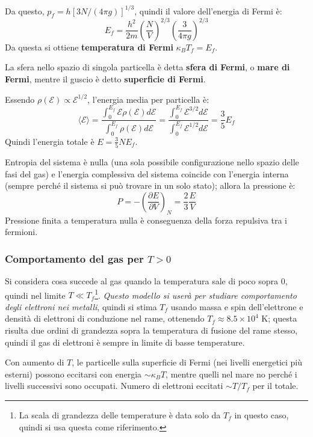 \documentclass[10pt, a4paper]{scrartcl}
\numberwithin{equation}{subsection}
\theoremstyle{style1}
\begin{document}
Da questo, $p_f = h [3N / (4\pi g)] ^{1 / 3}$, quindi il valore dell'energia di Fermi \`e:
\begin{equation}
	E_f = \frac{h^2}{2m} \left(\frac{N}{V}\right) ^{2/3} \left(\frac{3}{4\pi g} \right) ^{2 /3 }
\end{equation}
Da questa si ottiene \textbf{temperatura di Fermi} $\kappa _B T_f = E_f$. 

La sfera nello spazio di singola particella \`e detta \textbf{sfera di Fermi}, o \textbf{mare di Fermi}, mentre il guscio \`e detto \textbf{superficie di Fermi}.

Essendo $\rho (\mathscr{E}) \propto \mathscr{E}^{1 / 2} $, l'energia media per particella è:
\begin{equation}
	\langle \mathscr{E} \rangle = \frac{\displaystyle \int_{0} ^{E_f} \mathscr{E}\rho (\mathscr{E}) d \mathscr{E}}{\displaystyle \int_{0} ^{E_f} \rho (\mathscr{E}) d\mathscr{E}} = \frac{ \displaystyle \int_{0} ^{E_f} \mathscr{E}^{3 / 2}  d \mathscr{E}}{\displaystyle  \int_{0} ^{E_f} \mathscr{E}^{1 / 2}  d \mathscr{E}}= \frac{3}{5} E_f
\end{equation}
Quindi l'energia totale \`e $E = \frac{3}{5} N E_f$. 

Entropia del sistema \`e nulla (una sola possibile configurazione nello spazio delle fasi del gas) e l'energia complessiva del sistema coincide con l'energia interna (sempre perché il sistema si pu\`o trovare in un solo stato); allora la pressione \`e:
\[
P = - \left(\frac{\partial E}{\partial V} \right) _N = \frac{2}{3} \frac{E}{V}
\] 
Pressione finita a temperatura nulla \`e conseguenza della forza repulsiva tra i fermioni.	
\subsubsection{Comportamento del gas per $T>0$}
Si considera cosa succede al gas quando la temperatura sale di poco sopra $0$, quindi nel limite $T \ll T_f$\footnote{La scala di grandezza delle temperature \`e data solo da $T_f$ in questo caso, quindi si usa questa come riferimento.}. \textit{Questo modello si user\`a per studiare comportamento degli elettroni nei metalli}, quindi si stima $T_f$ usando massa e spin dell'elettrone e densit\`a di elettroni di conduzione nel rame, ottenendo $T_f \approx 8.5 \times 10^4$ K; questa risulta due ordini di grandezza sopra la temperatura di fusione del rame stesso, quindi il gas di elettroni \`e sempre in limite di basse temperature.

Con aumento di $T$, le particelle sulla superficie di Fermi (nei livelli energetici pi\`u esterni) possono eccitarsi con energia $\sim \kappa _B T$, mentre quelli nel mare no perch\'e i livelli successivi sono occupati. 
Numero di elettroni eccitati $\sim T / T_f$ per il totale. 
\end{document}
